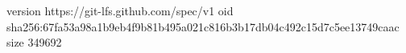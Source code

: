 version https://git-lfs.github.com/spec/v1
oid sha256:67fa53a98a1b9eb4f9b81b495a021c816b3b17db04c492c15d7c5ee13749caac
size 349692
